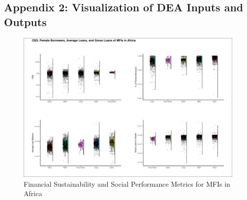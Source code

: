 \documentclass[
]{article}
\begin{document}
\begin{landscape}

\hypertarget{appendix-2-visualization-of-dea-inputs-and-outputs}{%
\subsection{Appendix 2: Visualization of DEA Inputs and
Outputs}\label{appendix-2-visualization-of-dea-inputs-and-outputs}}

\begin{figure}
\centering
\includegraphics{finsoc_efficiency_files/figure-latex/unnamed-chunk-37-1.pdf}
\caption{Financial Sustainability and Social Performance Metrics for
MFIs in Africa}
\end{figure}

\end{landscape}
\end{document}
